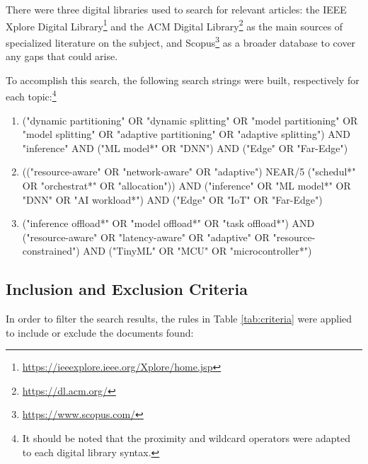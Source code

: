 There were three digital libraries used to search for relevant articles:
the IEEE Xplore Digital Library\footnote{\url{https://ieeexplore.ieee.org/Xplore/home.jsp}} and the ACM Digital
Library\footnote{\url{https://dl.acm.org/}} as the main sources of specialized
literature on the subject, and Scopus\footnote{\url{https://www.scopus.com/}} as a broader database
to cover any gaps that could arise.

To accomplish this search, the following search strings were built,
respectively for each topic:\footnote{It should be noted that the
proximity and wildcard operators were adapted to each digital library syntax.}
\begin{enumerate}
    \item ("dynamic partitioning" OR "dynamic splitting" OR "model partitioning" OR "model splitting" OR "adaptive partitioning" OR "adaptive splitting") AND "inference" AND ("ML model*" OR "DNN") AND ("Edge" OR "Far-Edge")	
    \item (("resource-aware" OR "network-aware" OR "adaptive") NEAR/5 ("schedul*" OR "orchestrat*" OR "allocation")) AND ("inference" OR "ML model*" OR "DNN" OR "AI workload*") AND ("Edge" OR "IoT" OR "Far-Edge")
    \item ("inference offload*" OR "model offload*" OR "task offload*") AND ("resource-aware" OR "latency-aware" OR "adaptive" OR "resource-constrained") AND ("TinyML" OR "MCU" OR "microcontroller*")
\end{enumerate}

\subsection{Inclusion and Exclusion Criteria} \label{sec:se222}

In order to filter the search results, the rules in Table \ref{tab:criteria} were applied to include or
exclude the documents found:

